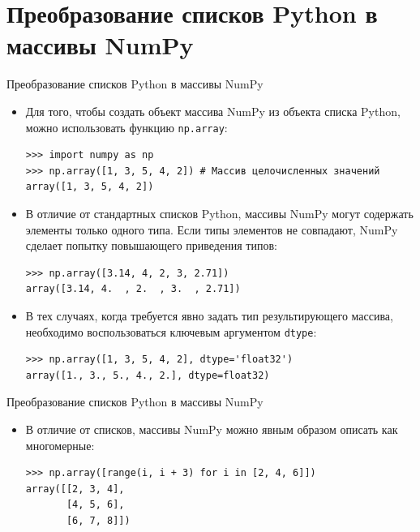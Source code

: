 \documentclass[aspectratio=169, mathserif]{beamer}	%
\begin{document}
\section{Преобразование списков Python в массивы NumPy}
\begin{frame}[fragile]{Преобразование списков Python в массивы NumPy}
\scriptsize
\begin{itemize}
	\item Для того, чтобы создать объект массива NumPy из объекта списка Python, можно использовать функцию \texttt{np.array}:
\begin{verbatim}
>>> import numpy as np
>>> np.array([1, 3, 5, 4, 2]) # Массив целочисленных значений
array([1, 3, 5, 4, 2])
\end{verbatim}

\item В отличие от стандартных списков Python, массивы NumPy могут содержать элементы только одного типа. Если типы элементов не совпадают, NumPy сделает попытку повышающего приведения типов:

\begin{verbatim}
>>> np.array([3.14, 4, 2, 3, 2.71])
array([3.14, 4.  , 2.  , 3.  , 2.71])
\end{verbatim}

\item В тех случаях, когда требуется явно задать тип результирующего массива, необходимо воспользоваться ключевым аргументом \texttt{dtype}:

\begin{verbatim}
>>> np.array([1, 3, 5, 4, 2], dtype='float32')
array([1., 3., 5., 4., 2.], dtype=float32)
\end{verbatim}
\end{itemize}
\vfill
\end{frame}

\begin{frame}[fragile]{Преобразование списков Python в массивы NumPy}
\scriptsize
\begin{itemize}
	\item В отличие от списков, массивы NumPy можно явным образом описать как многомерные:
	
\begin{verbatim}
>>> np.array([range(i, i + 3) for i in [2, 4, 6]])
array([[2, 3, 4],
       [4, 5, 6],
       [6, 7, 8]])
\end{verbatim}
\end{itemize}
\vfill
\end{frame}
\end{document}
